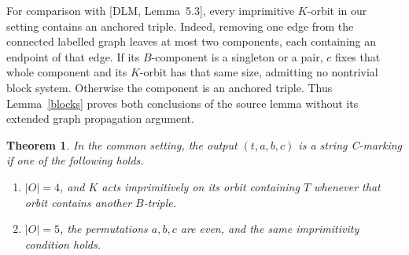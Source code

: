 \documentclass[a4paper,11pt]{article}
\newtheorem{theorem}{Theorem}\newtheorem{lemma}[theorem]{Lemma}
\begin{document}
For comparison with [DLM, Lemma~5.3], every imprimitive $K$-orbit in
our setting contains an anchored triple. Indeed, removing one edge from
the connected labelled graph leaves at most two components, each
containing an endpoint of that edge. If its $B$-component is a singleton
or a pair, $c$ fixes that whole component and its $K$-orbit has that same
size, admitting no nontrivial block system. Otherwise the component is
an anchored triple. Thus Lemma~\ref{blocks} proves both conclusions of
the source lemma without its extended graph propagation argument.

\begin{theorem}\label{positive}
In the common setting, the output $(t,a,b,c)$ is a string C-marking if
one of the following holds.
\begin{enumerate}
\item $|O|=4$, and $K$ acts imprimitively on its orbit containing $T$
whenever that orbit contains another $B$-triple.
\item $|O|=5$, the permutations $a,b,c$ are even, and the same
imprimitivity condition holds.
\end{enumerate}
\end{theorem}
\end{document}
